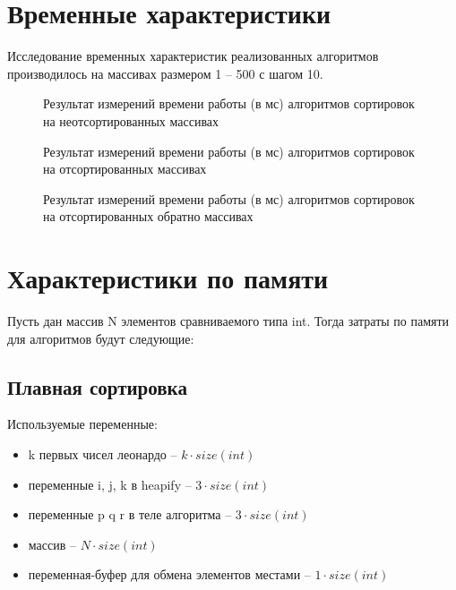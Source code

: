 \clearpage

\section{Временные характеристики}


Исследование временных характеристик реализованных алгоритмов производилось на массивах размером 1 -- 500 с шагом 10.

\begin{figure}[ht!]
	\centering
	
	\caption{Результат измерений времени работы (в мс) алгоритмов сортировок на неотсортированных массивах\label{overflow}}
	\label{fig:plotting_data1}
	\end{figure}
\clearpage

\begin{figure}[ht!]
	\centering
	
	\caption{Результат измерений времени работы (в мс) алгоритмов сортировок на отсортированных массивах\label{overflow}}
	\label{fig:plotting_data2}
	\end{figure}

\begin{figure}[ht!]
	\centering
	
	\caption{Результат измерений времени работы (в мс) алгоритмов сортировок на отсортированных обратно массивах\label{overflow}}
	\label{fig:plotting_data3}
	\end{figure}

	
\section{Характеристики по памяти}

Пусть дан массив N элементов сравниваемого типа int. Тогда затраты по памяти для алгоритмов будут следующие:

\subsection*{Плавная сортировка}

Используемые переменные:
\begin{itemize}
	\item k первых чисел леонардо -- $k \cdot size(int)$
	\item переменные i, j, k в heapify -- $3 \cdot size(int)$
	\item переменные p q r в теле алгоритма -- $3 \cdot size(int)$
	\item массив -- $N \cdot size(int)$
	\item переменная-буфер для обмена элементов местами -- $1 \cdot size(int)$
\end{itemize}

